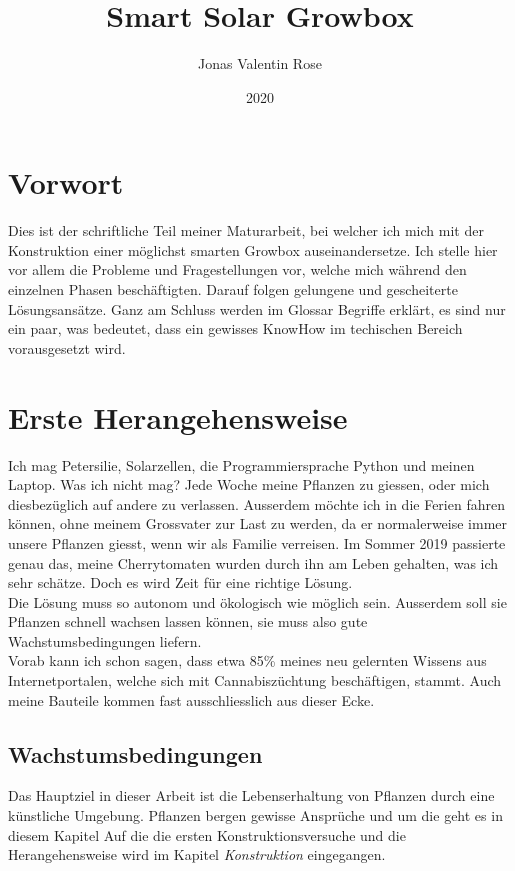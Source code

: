 \documentclass[12pt,titlepage,a4paper]{article}
\begin{document}
\begin{titlepage}
\title{Smart Solar Growbox}
\date{2020}
\author{Jonas Valentin Rose}
\end{titlepage}
\maketitle 
\tableofcontents
\newpage
\section{Vorwort}
Dies ist der schriftliche Teil meiner Maturarbeit, bei welcher ich mich  mit der Konstruktion einer möglichst smarten Growbox auseinandersetze. Ich stelle hier vor allem die Probleme und Fragestellungen vor, welche mich während den einzelnen Phasen beschäftigten. Darauf folgen gelungene und gescheiterte Lösungsansätze. Ganz am Schluss werden im Glossar Begriffe erklärt, es sind nur ein paar, was bedeutet, dass ein gewisses KnowHow im techischen Bereich vorausgesetzt wird.

\section{Erste Herangehensweise}
Ich mag Petersilie, Solarzellen, die Programmiersprache Python und meinen Laptop. Was ich nicht mag? Jede Woche meine Pflanzen zu giessen, oder mich diesbezüglich auf andere zu verlassen. Ausserdem möchte ich in die Ferien fahren können, ohne meinem Grossvater zur Last zu werden, da er normalerweise immer unsere Pflanzen giesst, wenn wir als Familie verreisen. Im Sommer 2019 passierte genau das, meine Cherrytomaten wurden durch ihn am Leben gehalten, was ich sehr schätze. Doch es wird Zeit für eine richtige Lösung. \\Die Lösung muss so autonom und ökologisch wie möglich sein. Ausserdem soll sie Pflanzen schnell wachsen lassen können, sie muss also gute Wachstumsbedingungen liefern. \\ Vorab kann ich schon sagen, dass etwa 85\% meines neu gelernten Wissens aus Internetportalen, welche sich mit Cannabiszüchtung beschäftigen, stammt. Auch meine Bauteile kommen fast ausschliesslich aus dieser Ecke.

\subsection{Wachstumsbedingungen}
Das Hauptziel in dieser Arbeit ist die Lebenserhaltung von Pflanzen durch eine künstliche Umgebung. Pflanzen bergen gewisse Ansprüche und um die geht es in diesem Kapitel
Auf die die ersten Konstruktionsversuche und die Herangehensweise wird im Kapitel \textit{Konstruktion} eingegangen.
\end{document}
